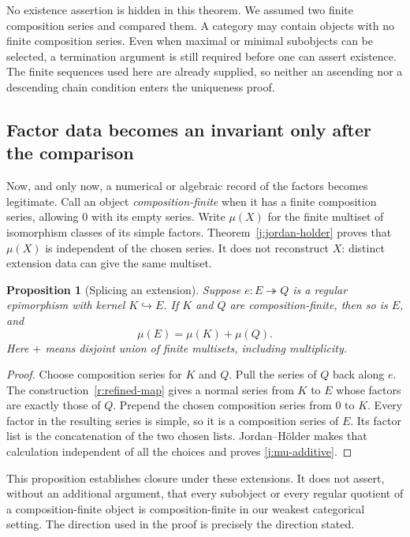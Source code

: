 \documentclass[11pt]{article}
\newtheorem{proposition}[theorem]{Proposition}
\theoremstyle{definition}
\theoremstyle{remark}\newtheorem{remark}[theorem]{Remark}
\begin{document}
No existence assertion is hidden in this theorem.  We assumed two finite
composition series and compared them.  A category may contain objects
with no finite composition series.  Even when maximal or minimal
subobjects can be selected, a termination argument is still required
before one can assert existence.  The finite sequences used here are
already supplied, so neither an ascending nor a descending chain
condition enters the uniqueness proof.

\subsection{Factor data becomes an invariant only after the comparison}

Now, and only now, a numerical or algebraic record of the factors becomes
legitimate.  Call an object \emph{composition-finite} when it has a finite
composition series, allowing $0$ with its empty series.  Write $\mu(X)$
for the finite multiset of isomorphism classes of its simple factors.
Theorem~\ref{j:jordan-holder} proves that $\mu(X)$ is independent of the
chosen series.  It does not reconstruct $X$: distinct extension data can
give the same multiset.

\begin{proposition}[Splicing an extension]
\label{j:extension-additivity}
\label{j:splicing}
Suppose $e:E\twoheadrightarrow Q$ is a regular epimorphism with kernel
$K\hookrightarrow E$.  If $K$ and $Q$ are composition-finite, then so is
$E$, and
\begin{equation}
\label{j:mu-additive}
                         \mu(E)=\mu(K)+\mu(Q).
\end{equation}
Here $+$ means disjoint union of finite multisets, including multiplicity.
\end{proposition}

\begin{proof}
Choose composition series for $K$ and $Q$.  Pull the series of $Q$ back
along $e$.  The construction~\eqref{r:refined-map} gives a normal series
from $K$ to $E$ whose factors are exactly those of $Q$.  Prepend the
chosen composition series from $0$ to $K$.  Every factor in the resulting
series is simple, so it is a composition series of $E$.  Its factor list
is the concatenation of the two chosen lists.  Jordan--H\"older makes
that calculation independent of all the choices and proves
\eqref{j:mu-additive}.
\end{proof}

This proposition establishes closure under these extensions.  It does
not assert, without an additional argument, that every subobject or every
regular quotient of a composition-finite object is composition-finite in
our weakest categorical setting.  The direction used in the proof is
precisely the direction stated.
\end{document}
